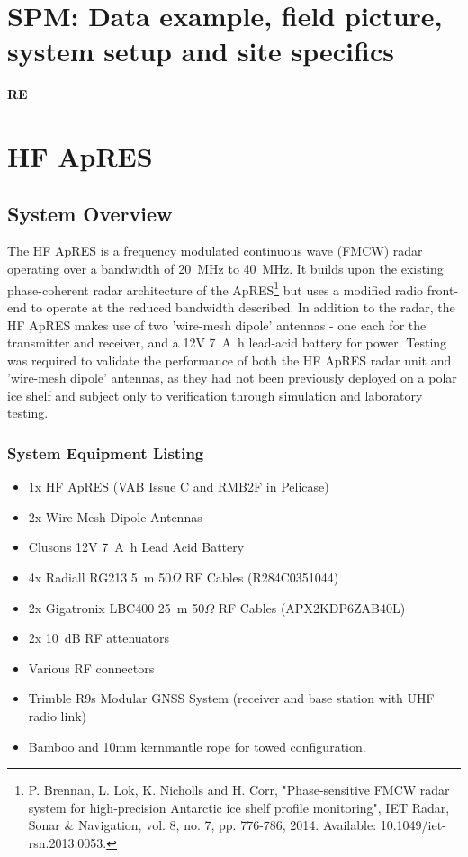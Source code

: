 \documentclass[a4paper,12pt]{article}
\begin{document}
\pagebreak
\section{SPM: Data example, field picture, system setup and site specifics}
\textbf{RE}
\label{SecSPM}

\pagebreak
\section{HF ApRES}
\label{SecHFApRES}

\subsection{System Overview}
The HF ApRES is a frequency modulated continuous wave (FMCW) radar operating
over a bandwidth of \SI{20}{\mega\hertz} to \SI{40}{\mega\hertz}.  It builds
upon the existing phase-coherent radar architecture of the ApRES\footnote{
  P. Brennan, L. Lok, K. Nicholls and H. Corr, "Phase‐sensitive FMCW radar 
  system for high‐precision Antarctic ice shelf profile monitoring", IET 
  Radar, Sonar \& Navigation, vol. 8, no. 7, pp. 776-786, 2014. Available: 
  10.1049/iet-rsn.2013.0053.
} but uses a modified radio front-end to operate at the reduced bandwidth
described.  In addition to the radar, the HF ApRES makes use of two 'wire-mesh
dipole' antennas - one each for the transmitter and receiver, and a 12V 
\SI{7}{\ampere\hour} lead-acid battery for power.  Testing was required 
to validate the performance of both the HF ApRES radar unit and 
'wire-mesh dipole' antennas, as they had not been previously deployed on a 
polar ice shelf and subject only to verification through simulation and 
laboratory testing.

\subsubsection{System Equipment Listing}
\begin{itemize}
  \item 1x HF ApRES (VAB Issue C and RMB2F in Pelicase)
  \item 2x Wire-Mesh Dipole Antennas
  \item Clusons 12V \SI{7}{\ampere\hour} Lead Acid Battery
  \item 4x Radiall RG213 \SI{5}{\metre} 50$\Omega$ RF Cables (R284C0351044)
  \item 2x Gigatronix LBC400 \SI{25}{\metre} 50$\Omega$ RF Cables (APX2KDP6ZAB40L)
  \item 2x \SI{10}{\deci\bel} RF attenuators
  \item Various RF connectors
  \item Trimble R9s Modular GNSS System (receiver and base station with UHF
  radio link)
  \item Bamboo and 10mm kernmantle rope for towed configuration.
\end{itemize}
\end{document}
